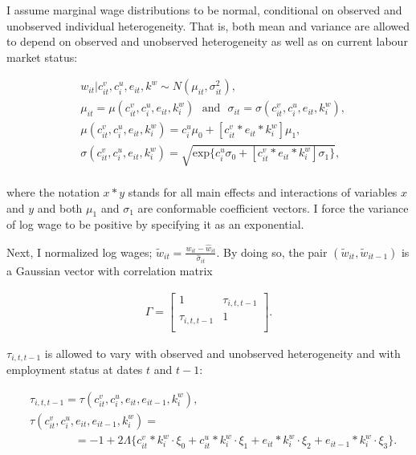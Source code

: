 \documentclass[12pt, a4paper]{article}
\begin{document}


I assume marginal wage distributions to be normal, conditional on observed and unobserved individual heterogeneity. That is, both mean and variance are allowed to depend on observed and unobserved heterogeneity as well as on current labour market status:

\begin{align}
& w_{it}  |c_{it}^{v},c_{i}^{u},e_{it},k^w \sim N(\mu_{it},\sigma_{it}^{2}),\\ \nonumber
& \mu_{it} = \mu(c_{it}^{v},c_{i}^{u},e_{it},k_i^w)\,\,\,\, \text{and}\,\,\,\, \sigma_{it} =\sigma(c_{it}^{v},c_{i}^{u},e_{it},k_i^w), \\ \nonumber
& \mu(c_{it}^{v},c_{i}^{u},e_{it},k_i^w) = c_i^{u}\mu_0+[c_{it}^{v}\ast e_{it}\ast k_{i}^w]\mu_1, \\ \nonumber
& \sigma(c_{it}^{v},c_{i}^{u},e_{it},k_i^w) = \sqrt{\text{exp}\{c_i^{u}\sigma_0+[c_{it}^{v}\ast e_{it}\ast k_{i}^w]\sigma_1\}}, \\ \nonumber
\end{align}

where the notation $x\ast y$ stands for all main effects and interactions of variables $x$ and $y$ and both $\mu_1$ and $\sigma_1$ are conformable coefficient vectors. I force the variance of log wage to be positive by specifying it as an exponential.

Next, I normalized log wages; $\tilde{w}_{it}=\frac{w_{it} - \hat{w}_{it}}{\hat{\sigma}_{it}}$. By doing so, the pair $(\tilde{w}_{it},\tilde{w}_{it-1})$ is a Gaussian vector with correlation matrix


\begin{align}
\Gamma =
\left[ {\begin{array}{cc}
1 & \tau_{i,t,t-1} \\
\tau_{i,t,t-1} & 1 \\
\end{array}} \right].
\end{align}

$\tau_{i,t,t-1}$ is allowed to vary with observed and unobserved heterogeneity and with employment status at dates $t$ and $t-1$:

\begin{align}
& \tau_{i,t,t-1} = \tau(c_{it}^{v},c_{i}^{u},e_{it},e_{it-1},k_i^w), \\ \nonumber
& \tau(c_{it}^{v},c_{i}^{u},e_{it},e_{it-1},k_i^w) = \\ \nonumber
& \,\,\,\,\,\,\,\,\,\,\,\,\,\,\,\,\,\,\,\,\,\,\,\, = -1 + 2\Lambda\Big\{c_{it}^{v}\ast k_{i}^{w}\cdot \xi_0+c_{it}^{u}\ast k_{i}^{w}\cdot \xi_1+e_{it}\ast k_{i}^{w}\cdot \xi_2+e_{it-1}\ast k_{i}^{w}\cdot \xi_3 \Big\}.
\end{align}
\end{document}
